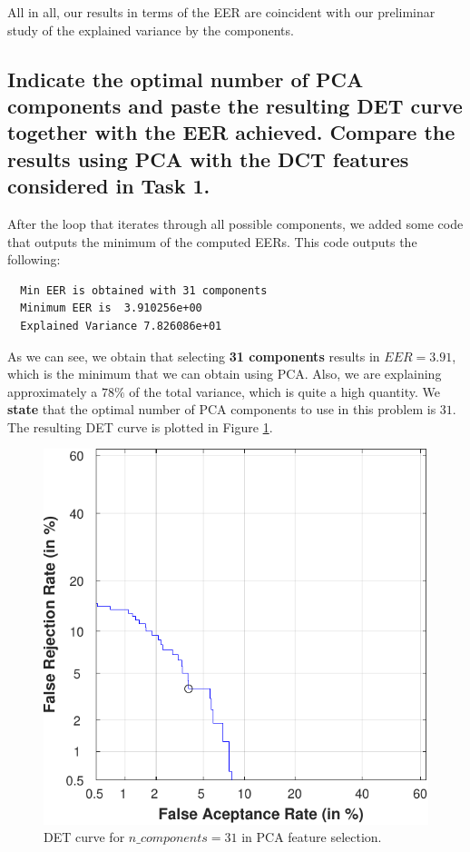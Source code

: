 \documentclass[a4paper]{article}
\begin{document}
All in all, our results in terms of the EER are coincident with our preliminar study of the explained variance by the components.




\subsection{ Indicate the optimal number of PCA components and paste the resulting DET curve together with the EER achieved. Compare the results using PCA with the DCT features considered in Task 1.}

After the loop that iterates through all possible components, we added some code that outputs the minimum of the computed EERs. This code outputs the following:

\begin{verbatim}
  Min EER is obtained with 31 components
  Minimum EER is  3.910256e+00 
  Explained Variance 7.826086e+01
\end{verbatim}

As we can see, we obtain that selecting \textbf{31 components} results in \(EER = 3.91\), which is the minimum that we can obtain using PCA. Also, we are explaining approximately a \(78\%\) of the total variance, which is quite a high quantity. We \textbf{state} that the optimal number of PCA components to use in this problem is \(31\). The resulting DET curve is plotted in Figure \ref{fig:ex2c-optim}.

\begin{figure}[H]
  \centering
  \includegraphics[scale=0.7]{Figures/DET-optim-comps-PCA}
    \caption{DET curve for \(n\_components = 31\) in PCA feature selection.}
    \label{fig:ex2c-optim}
\end{figure}
\end{document}
